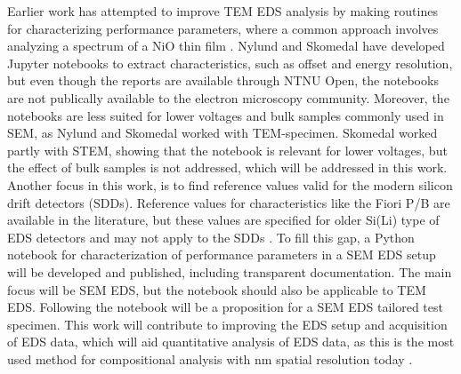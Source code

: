 

Earlier work has attempted to improve TEM EDS analysis by making routines for characterizing performance parameters, where a common approach involves analyzing a spectrum of a NiO thin film \cite{egerton_nio_characterization_1994,ted_pella_nio_tem_2019}.
Nylund \cite{nylund_evaluation_2017} and Skomedal \cite{skomedal_improving_2022} have developed Jupyter notebooks to extract characteristics, such as offset and energy resolution, but even though the reports are available through NTNU Open, the notebooks are not publically available to the electron microscopy community.
Moreover, the notebooks are less suited for lower voltages and bulk samples commonly used in SEM, as Nylund and Skomedal worked with TEM-specimen.
Skomedal worked partly with STEM, showing that the notebook is relevant for lower voltages, but the effect of bulk samples is not addressed, which will be addressed in this work.
Another focus in this work, is to find reference values valid for the modern silicon drift detectors (SDDs).
Reference values for characteristics like the Fiori P/B \cite{fiori_peak_background_1982} are available in the literature, but these values are specified for older Si(Li) type of EDS detectors and may not apply to the SDDs \cite{sdd_lechner_2001}.
To fill this gap, a Python notebook for characterization of performance parameters in a SEM EDS setup will be developed and published, including transparent documentation.
The main focus will be SEM EDS, but the notebook should also be applicable to TEM EDS.
Following the notebook will be a proposition for a SEM EDS tailored test specimen.
This work will contribute to improving the EDS setup and acquisition of EDS data, which will aid quantitative analysis of EDS data, as this is the most used method for compositional analysis with nm spatial resolution today \cite{goldstein_scanning_2018}.




